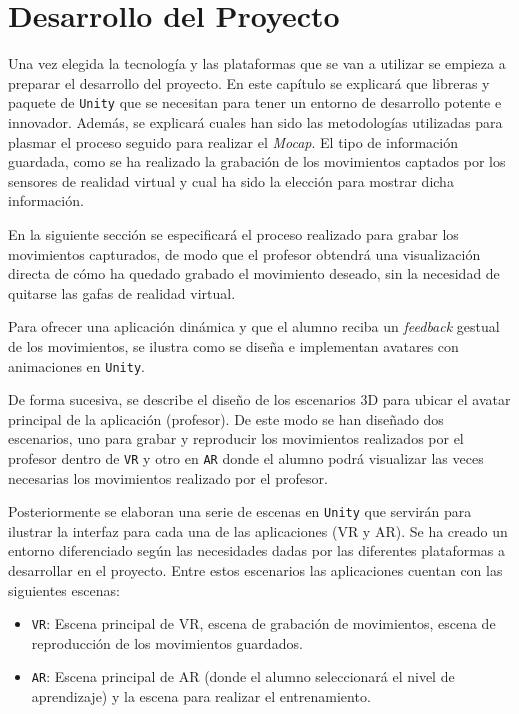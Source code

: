 %
%
\chapter{Desarrollo del Proyecto}
\label{cap5:sec:Desarrollo del Proyecto}

Una vez elegida la tecnología y las plataformas que se van a utilizar se empieza a preparar el desarrollo del proyecto. En este capítulo se explicará que libreras y paquete de \texttt{Unity} que se necesitan para tener un entorno de desarrollo potente e innovador. Además, se explicará cuales han sido las metodologías utilizadas para plasmar el proceso seguido para realizar el \textit{Mocap}. El tipo de información guardada, como se ha realizado la grabación de los movimientos captados por los sensores de realidad virtual y cual ha sido la elección para mostrar dicha información.

En la siguiente sección se especificará el proceso realizado para grabar los movimientos capturados, de modo que el profesor obtendrá una visualización directa de cómo ha quedado grabado el movimiento deseado, sin la necesidad de quitarse las gafas de realidad virtual.

Para ofrecer una aplicación dinámica y que el alumno reciba un \textit{feedback} gestual de los movimientos, se ilustra como se diseña e implementan avatares con animaciones en \texttt{Unity}.

De forma sucesiva, se describe el diseño de los escenarios 3D para ubicar el avatar principal de la aplicación (profesor). De este modo se han diseñado dos escenarios, uno para grabar y reproducir los movimientos realizados por el profesor dentro de \texttt{VR} y otro en \texttt{AR} donde el alumno podrá visualizar las veces necesarias los movimientos realizado por el profesor.

Posteriormente se elaboran una serie de escenas en \texttt{Unity} que servirán para ilustrar la interfaz para cada una de las aplicaciones (VR y AR). Se ha creado un entorno diferenciado según las necesidades dadas por las diferentes plataformas a desarrollar en el proyecto. Entre estos escenarios las aplicaciones cuentan con las siguientes escenas:

\begin{itemize}
	\item \texttt{VR}: Escena principal de VR, escena de grabación de movimientos, escena de reproducción de los movimientos guardados.
 	\item \texttt{AR}: Escena principal de AR (donde el alumno seleccionará el nivel de aprendizaje) y la escena para realizar el entrenamiento.
\end{itemize}

